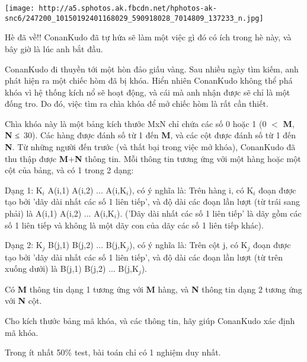 \texttt{[image: http://a5.sphotos.ak.fbcdn.net/hphotos-ak-snc6/247200\_10150192401168029\_590918028\_7014809\_137233\_n.jpg]}

Hè đã về!! ConanKudo đã tự hứa sẽ làm một việc gì đó có ích trong hè này, và bây giờ là lúc anh bắt đầu.

ConanKudo đi thuyền tới một hòn đảo giấu vàng. Sau nhiều ngày tìm kiếm, anh phát hiện ra một chiếc hòm đã bị khóa. Hiển nhiên ConanKudo không thể phá khóa vì hệ thống kích nổ sẽ hoạt động, và cái mà anh nhận được sẽ chỉ là một đống tro. Do đó, việc tìm ra chìa khóa để mở chiếc hòm là rất cần thiết.

Chìa khóa này là một bảng kích thước MxN chỉ chứa các số 0 hoặc 1 (0 $<$ \textbf{M}, \textbf{N} ≤ 30). Các hàng được đánh số từ 1 đến \textbf{M}, và các cột được đánh số từ 1 đến \textbf{N}. Từ những người đến trước (và thất bại trong việc mở khóa), ConanKudo đã thu thập được \textbf{M}+\textbf{N} thông tin. Mỗi thông tin tương ứng với một hàng hoặc một cột của bảng, và có 1 trong 2 dạng:

Dạng 1: K$_i$ A(i,1) A(i,2) ... A(i,K$_i$), có ý nghĩa là: Trên hàng i, có K$_i$ đoạn được tạo bởi 'dãy dài nhất các số 1 liên tiếp', và độ dài các đoạn lần lượt (từ trái sang phải) là A(i,1) A(i,2) ... A(i,K$_i$). ('Dãy dài nhất các số 1 liên tiếp' là dãy gồm các số 1 liên tiếp và không là một dãy con của dãy các số 1 liên tiếp khác).

Dạng 2: K$_j$ B(j,1) B(j,2) ... B(j,K$_j$), có ý nghĩa là: Trên cột j, có K$_j$ đoạn được tạo bởi 'dãy dài nhất các số 1 liên tiếp', và độ dài các đoạn lần lượt (từ trên xuống dưới) là B(j,1) B(j,2) ... B(j,K$_j$).

Có \textbf{M} thông tin dạng 1 tương ứng với \textbf{M} hàng, và \textbf{N} thông tin dạng 2 tương ứng với \textbf{N} cột.

Cho kích thước bảng mã khóa, và các thông tin, hãy giúp ConanKudo xác định mã khóa.

Trong ít nhất 50\% test, bài toán chỉ có 1 nghiệm duy nhất.